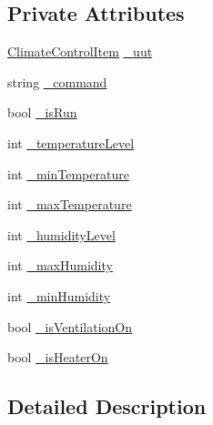 \subsection*{Private Attributes}
\begin{DoxyCompactItemize}
\item 
\mbox{\hyperlink{class_f_w_p_s_1_1_models_1_1_climate_control_item}{Climate\+Control\+Item}} \mbox{\hyperlink{class_web_api_1_1_unit_1_1_test_1_1_u_t___climate_control_item_a5920db9bd8fa5f6c4ee396fcbba76a85}{\+\_\+uut}}
\item 
string \mbox{\hyperlink{class_web_api_1_1_unit_1_1_test_1_1_u_t___climate_control_item_ab3bd89e0166421bad1b5a20cd916eaf8}{\+\_\+command}}
\item 
bool \mbox{\hyperlink{class_web_api_1_1_unit_1_1_test_1_1_u_t___climate_control_item_a75cddb6ed4c986535f29d9fc57056c02}{\+\_\+is\+Run}}
\item 
int \mbox{\hyperlink{class_web_api_1_1_unit_1_1_test_1_1_u_t___climate_control_item_ae22002aaf0d9eb14aacfa0812aa1a63e}{\+\_\+temperature\+Level}}
\item 
int \mbox{\hyperlink{class_web_api_1_1_unit_1_1_test_1_1_u_t___climate_control_item_a60e63e071f83152934fd62f613f15db2}{\+\_\+min\+Temperature}}
\item 
int \mbox{\hyperlink{class_web_api_1_1_unit_1_1_test_1_1_u_t___climate_control_item_a2a9ecf762d762c02729a6ef6cbadcbf5}{\+\_\+max\+Temperature}}
\item 
int \mbox{\hyperlink{class_web_api_1_1_unit_1_1_test_1_1_u_t___climate_control_item_a1d40b803203265b4bedce40c621b41c1}{\+\_\+humidity\+Level}}
\item 
int \mbox{\hyperlink{class_web_api_1_1_unit_1_1_test_1_1_u_t___climate_control_item_a5b5bc1ff6c784c4d2e43ce0a86cf2956}{\+\_\+max\+Humidity}}
\item 
int \mbox{\hyperlink{class_web_api_1_1_unit_1_1_test_1_1_u_t___climate_control_item_ab9a79e6a82e458dba7fa201c65729572}{\+\_\+min\+Humidity}}
\item 
bool \mbox{\hyperlink{class_web_api_1_1_unit_1_1_test_1_1_u_t___climate_control_item_ad56b2db47a04ec840da2cb8ec95fb582}{\+\_\+is\+Ventilation\+On}}
\item 
bool \mbox{\hyperlink{class_web_api_1_1_unit_1_1_test_1_1_u_t___climate_control_item_a23b982b0f789236e41f0785dc338821a}{\+\_\+is\+Heater\+On}}
\end{DoxyCompactItemize}


\subsection{Detailed Description}


